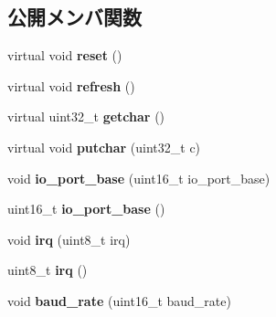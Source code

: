 \subsection*{公開メンバ関数}
\begin{DoxyCompactItemize}
\item 
\hypertarget{classserial__console_a86f0ff28692c55debc2f39d3175fc52e}{}virtual void {\bfseries reset} ()\label{classserial__console_a86f0ff28692c55debc2f39d3175fc52e}

\item 
\hypertarget{classserial__console_ab652d9c5c8122739dfa377625f457333}{}virtual void {\bfseries refresh} ()\label{classserial__console_ab652d9c5c8122739dfa377625f457333}

\item 
\hypertarget{classserial__console_a63393073ee917b8d5ecd04922e8b0219}{}virtual uint32\+\_\+t {\bfseries getchar} ()\label{classserial__console_a63393073ee917b8d5ecd04922e8b0219}

\item 
\hypertarget{classserial__console_aa75329918015828987a4327d183e82fc}{}virtual void {\bfseries putchar} (uint32\+\_\+t c)\label{classserial__console_aa75329918015828987a4327d183e82fc}

\item 
\hypertarget{classserial__console_a7997c59282c7c6646453496b32b62f71}{}void {\bfseries io\+\_\+port\+\_\+base} (uint16\+\_\+t io\+\_\+port\+\_\+base)\label{classserial__console_a7997c59282c7c6646453496b32b62f71}

\item 
\hypertarget{classserial__console_a8f5ba5b33eeb7b126c23f48300949ae6}{}uint16\+\_\+t {\bfseries io\+\_\+port\+\_\+base} ()\label{classserial__console_a8f5ba5b33eeb7b126c23f48300949ae6}

\item 
\hypertarget{classserial__console_a649deaac8973408643de56bbe1438890}{}void {\bfseries irq} (uint8\+\_\+t irq)\label{classserial__console_a649deaac8973408643de56bbe1438890}

\item 
\hypertarget{classserial__console_a286ec03d4c3b6d35c29ac65c237741cd}{}uint8\+\_\+t {\bfseries irq} ()\label{classserial__console_a286ec03d4c3b6d35c29ac65c237741cd}

\item 
\hypertarget{classserial__console_a55aea672eefcfeadd7630531dc925613}{}void {\bfseries baud\+\_\+rate} (uint16\+\_\+t baud\+\_\+rate)\label{classserial__console_a55aea672eefcfeadd7630531dc925613}


\end{DoxyCompactItemize}
